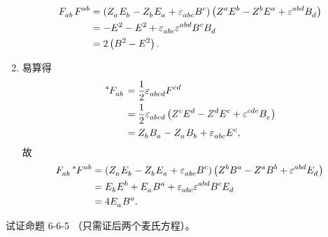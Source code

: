 \begin{xiti}
\begin{zm}
\begin{enumerate}[label=(\alph*)]
\begin{equation*}
\begin{split}
						\tensor{F}{_a_b} \tensor{F}{^a^b} &= \left( \tensor{Z}{_a} \tensor{E}{_b} - \tensor{Z}{_b} \tensor{E}{_a} + \tensor{\varepsilon}{_a_b_c} \tensor{B}{^c} \right) \left( \tensor{Z}{^a} \tensor{E}{^b} - \tensor{Z}{^b} \tensor{E}{^a} + \tensor{\varepsilon}{^a^b^d} \tensor{B}{_d} \right)\\
						&= -E^2 - E^2 + \tensor{\varepsilon}{_a_b_c} \tensor{\varepsilon}{^a^b^d} \tensor{B}{^c} \tensor{B}{_d}\\
						&= 2 \left( B^2 - E^2 \right).
					\end{split}
				\end{equation*}
				\item 易算得
				\begin{equation}
					\begin{split}
						\tensor[^*]{F}{_a_b} &= \frac{1}{2} \tensor{\varepsilon}{_a_b_c_d} \tensor{F}{^c^d}\\
						&= \frac{1}{2} \tensor{\varepsilon}{_a_b_c_d} \left( \tensor{Z}{^c} \tensor{E}{^d} - \tensor{Z}{^d} \tensor{E}{^c} + \tensor{\varepsilon}{^c^d^e} \tensor{B}{_e} \right)\\
						&= \tensor{Z}{_b}\tensor{B}{_a} - \tensor{Z}{_a} \tensor{B}{_b} + \tensor{\varepsilon}{_a_b_c} \tensor{E}{^c},\label{eq-*F}
					\end{split}
				\end{equation}
				故
				\begin{equation*}
					\begin{split}
						\tensor{F}{_a_b} \tensor[^*]{F}{^a^b} &=  \left( \tensor{Z}{_a} \tensor{E}{_b} - \tensor{Z}{_b} \tensor{E}{_a} + \tensor{\varepsilon}{_a_b_c} \tensor{B}{^c} \right) \left( \tensor{Z}{^b}\tensor{B}{^a} - \tensor{Z}{^a} \tensor{B}{^b} + \tensor{\varepsilon}{^a^b^d} \tensor{E}{_d} \right)\\
						&= \tensor{E}{_b} \tensor{E}{^b} + \tensor{E}{_a} \tensor{B}{^a} + \tensor{\varepsilon}{_a_b_c} \tensor{\varepsilon}{^a^b^d} \tensor{B}{^c} \tensor{E}{_d}\\
						&= 4 \tensor{E}{_a} \tensor{B}{^a}.
					\end{split}
				\end{equation*}
			\end{enumerate}
		\end{zm}

	\item 试证命题 6-6-5 （只需证后两个麦氏方程）。


\end{xiti}
